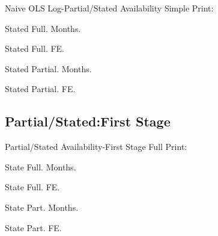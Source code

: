 \documentclass{beamer}
\begin{document}
\begin{frame}{}
\scalebox{0.65}{}
\end{frame}

\begin{frame}{Naive OLS Log-Partial/Stated Availability}
Simple Print:

Stated Full. Months.

Stated Full. FE.

Stated Partial. Months.

Stated Partial. FE.
\end{frame}

\begin{frame}{}
\scalebox{0.65}{}
\end{frame}

\begin{frame}{}
\scalebox{0.65}{}
\end{frame}

\begin{frame}{}
\scalebox{0.65}{}
\end{frame}

\begin{frame}{}
\scalebox{0.65}{}
\end{frame}



\subsection{Partial/Stated:First Stage}

\begin{frame}{Partial/Stated Availability-First Stage}
Full Print:

State Full. Months.

State Full. FE.

State Part. Months.

State Part. FE.
\end{frame}


\begin{frame}{}
\scalebox{0.5}{}
\end{frame}
\end{document}
